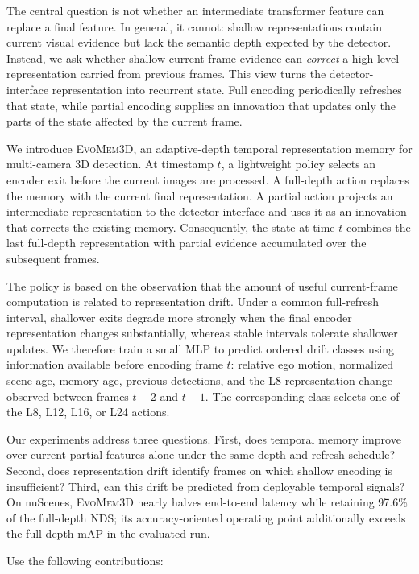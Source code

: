 \documentclass[10pt,twocolumn,letterpaper]{article}
\newcommand{\method}{\textsc{EvoMem3D}}
\begin{document}
The central question is not whether an intermediate transformer
feature can replace a final feature. In general, it cannot: shallow
representations contain current visual evidence but lack the semantic
depth expected by the detector. Instead, we ask whether shallow
current-frame evidence can \emph{correct} a high-level representation
carried from previous frames. This view turns the detector-interface
representation into recurrent state. Full encoding periodically
refreshes that state, while partial encoding supplies an innovation
that updates only the parts of the state affected by the current
frame.

We introduce \method{}, an adaptive-depth temporal representation
memory for multi-camera 3D detection. At timestamp $t$, a lightweight
policy selects an encoder exit before the current images are
processed. A full-depth action replaces the memory with the current
final representation. A partial action projects an intermediate
representation to the detector interface and uses it as an innovation
that corrects the existing memory. Consequently, the state at time
$t$ combines the last full-depth representation with partial evidence
accumulated over the subsequent frames.

The policy is based on the observation that the amount of useful
current-frame computation is related to representation drift. Under
a common full-refresh interval, shallower exits degrade more strongly
when the final encoder representation changes substantially, whereas
stable intervals tolerate shallower updates. We therefore train a
small MLP to predict ordered drift classes using information available
before encoding frame $t$: relative ego motion, normalized scene age,
memory age, previous detections, and the L8 representation change
observed between frames $t-2$ and $t-1$. The corresponding class
selects one of the L8, L12, L16, or L24 actions.

Our experiments address three questions. First, does temporal memory
improve over current partial features alone under the same depth and
refresh schedule? Second, does representation drift identify frames
on which shallow encoding is insufficient? Third, can this drift be
predicted from deployable temporal signals? On nuScenes, \method{}
nearly halves end-to-end latency while retaining 97.6\% of the
full-depth NDS; its accuracy-oriented operating point additionally
exceeds the full-depth mAP in the evaluated run.

Use the following contributions:
\end{document}
